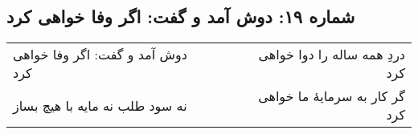 \begin{center}
\section*{شماره ۱۹: دوش آمد و گفت: اگر وفا خواهی کرد}
\label{sec:019}
\begin{longtable}{l p{0.5cm} r}
دوش آمد و گفت: اگر وفا خواهی کرد
&&
دردِ همه ساله را دوا خواهی کرد
\\
نه سود طلب نه مایه با هیچ بساز
&&
گر کار به سرمایهٔ ما خواهی کرد
\\
\end{longtable}
\end{center}
